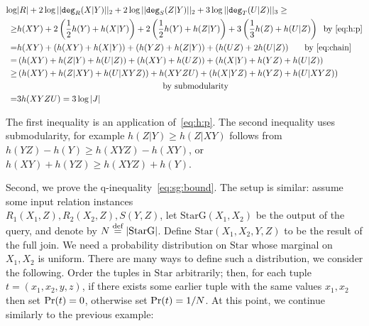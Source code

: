 {
  \begin{align*}
    \log & |R| +  2 \log \lp{\degree_R(X|Y)}_2 +  2 \log  \lp{\degree_S(Z|Y)}_{2} + 3 \log \lp{\degree_T(U|Z)}_3 \geq \\
    \geq & h(XY) + 2\left(\frac{1}{2}h(Y)+h(X|Y)\right)+2\left(\frac{1}{2}h(Y)+h(Z|Y)\right)+3\left(\frac{1}{3}h(Z)+h(U|Z)\right)
          \text{\hspace{2mm}by~\eqref{eq:h:p}}\\
    = & h(XY)+\left(h(XY)+h(X|Y)\right)+\left(h(YZ)+h(Z|Y)\right)+\left(h(UZ)+2h(U|Z)\right)
         \text{\hspace{6mm}by~\eqref{eq:chain}}\\
    = & \left(h(XY) + h(Z|Y)+ h(U|Z)\right) + \left(h(XY)+h(UZ)\right)+\left(h(X|Y)+h(YZ)+h(U|Z)\right)  \\
    \geq & \left(h(XY) + h(Z|XY)+ h(U|XYZ)\right)  + h(XYZU) + \left(h(X|YZ)+h(YZ)+h(U|XYZ)\right)\\
         &\text{\hspace{60mm}by submodularity}\\
    = & 3 h(XYZU) = 3 \log |J|
  \end{align*}
}

The first inequality is an application of~\eqref{eq:h:p}.  The second
inequality uses submodularity, for example $h(Z|Y) \geq h(Z|XY)$
follows from $h(YZ)-h(Y) \geq h(XYZ)-h(XY)$, or
$h(XY)+h(YZ)\geq h(XYZ)+h(Y)$.

Second, we prove the q-inequality~\eqref{eq:sg:bound}.  The setup is
similar: assume some input relation instances\\
$R_1(X_1,Z), R_2(X_2,Z), S(Y,Z)$, let $\text{StarG}(X_1,X_2)$ be the output of
the query, and denote by $N \stackrel{\text{def}}{=} |\text{StarG}|$.  Define $\text{Star}(X_1,X_2,Y,Z)$ to
be the result of the full join.  We need a probability distribution on
$\text{Star}$ whose marginal on $X_1,X_2$ is uniform.  There are many ways to
define such a distribution, we consider the following.  Order the
tuples in $\text{Star}$ arbitrarily; then, for each tuple $t = (x_1,x_2,y,z)$,
if there exists some earlier tuple with the same values $x_1,x_2$ then
set $\mathop{\textnormal{Pr}}(t)=0$, otherwise set $\mathop{\textnormal{Pr}}(t)=1/N$.  At this point, we continue
similarly to the previous example:


